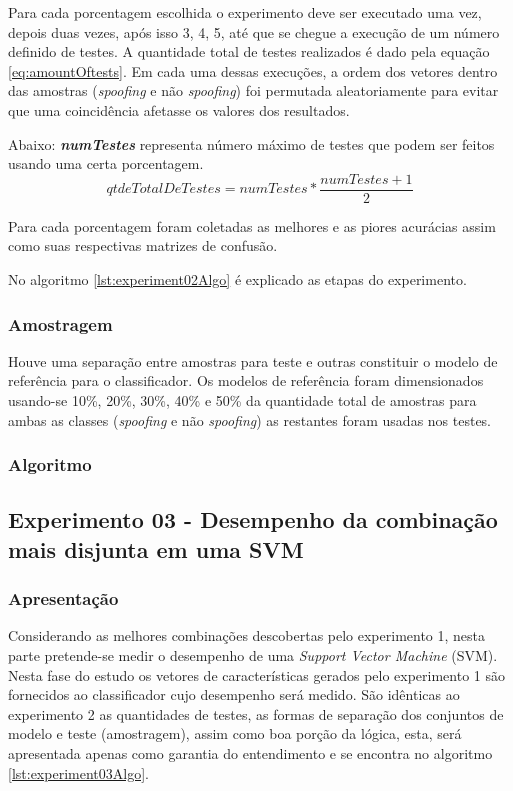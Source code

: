 				\par Para cada porcentagem escolhida o experimento deve ser executado uma vez, depois duas vezes, após isso 3, 4, 5, até que se chegue a execução de um número definido de testes. A quantidade total de testes realizados é dado pela equação \ref{eq:amountOftests}. Em cada uma dessas execuções, a ordem dos vetores dentro das amostras (\textit{spoofing} e não \textit{spoofing}) foi permutada aleatoriamente para evitar que uma coincidência afetasse os valores dos resultados.
				
				\par Abaixo: \textit{\textbf{numTestes}} representa número máximo de testes que podem ser feitos usando uma certa porcentagem.
				\begin{equation}
					\label{eq:amountOftests}
					qtdeTotalDeTestes= numTestes * \dfrac{numTestes + 1}{2}
				\end{equation}
				
				\par Para cada porcentagem foram coletadas as melhores e as piores acurácias assim como suas respectivas matrizes de confusão.
				
				\par No algoritmo \ref{lst:experiment02Algo} é explicado as etapas do experimento.
								
			\subsubsection{Amostragem}
				\par Houve uma separação entre amostras para teste e outras constituir o modelo de referência para o classificador. Os modelos de referência foram dimensionados usando-se 10\%, 20\%, 30\%, 40\% e 50\% da quantidade total de amostras para ambas as classes (\textit{spoofing} e não \textit{spoofing}) as restantes foram usadas nos testes.	
			\subsubsection{Algoritmo}
			

		\subsection{Experimento 03 - Desempenho da combinação mais disjunta em uma SVM}
		\label{chap:propApproach:sec:Experimento03}
			\subsubsection{Apresentação}
				\par Considerando as melhores combinações descobertas pelo experimento 1, nesta parte pretende-se medir o desempenho de uma \textit{Support Vector Machine} (SVM). Nesta fase do estudo os vetores de características gerados pelo experimento 1 são fornecidos ao classificador cujo desempenho será medido. São idênticas ao experimento 2 as quantidades de testes, as formas de separação dos conjuntos de modelo e teste (amostragem), assim como boa porção da lógica, esta, será apresentada apenas como garantia do entendimento e se encontra no algoritmo \ref{lst:experiment03Algo}.

